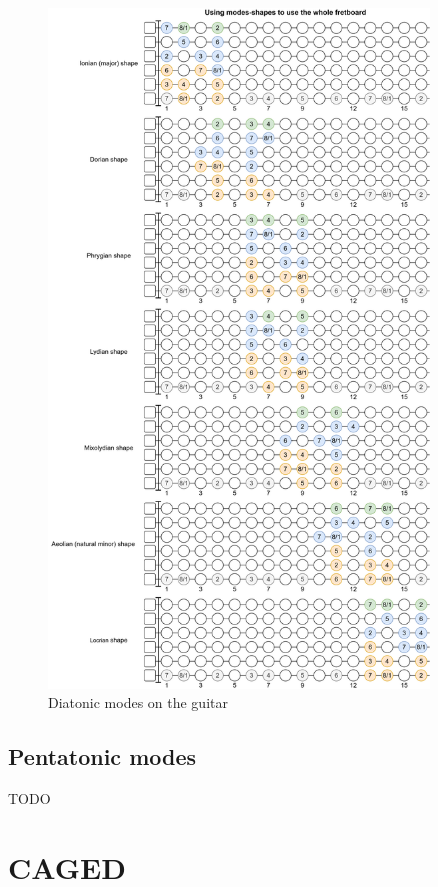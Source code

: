 \begin{figure}[h]
	\centering
	\includegraphics[width=0.9\textwidth]{../../Images/guitar_mode_all.png}
	\caption{Diatonic modes on the guitar}
	\label{fig:guitar_diatonic_modes_on_guitar}
\end{figure}

\clearpage

\subsection{Pentatonic modes}
TODO

\newpage

\section{CAGED}

